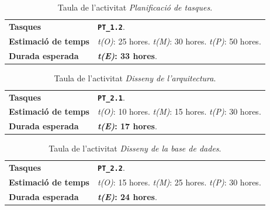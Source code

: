 \documentclass[a4paper,12pt]{ThesisStyle}
\begin{document}
\begin{table}[H]
  \begin{tabularx}{\textwidth}{l | X}
    \toprule
    \rowcolor{Gray}
    \multicolumn{2}{c}{\texttt{\textbf{A2:}} Planificació de tasques}\\
    \midrule[0.9pt]
    \textbf{Tasques}                 & \texttt{\textbf{PT\_1.2}}.\\
    \midrule
    \textbf{Estimació de temps}      & \textit{t(O)}: 25 hores.
    \newline \textit{t(M)}: 30 hores.
    \newline \textit{t(P)}: 50 hores.\\
    \midrule
    \textbf{Durada esperada}         & \textbf{\textit{t(E)}: 33 hores}.\\
    \bottomrule
  \end{tabularx}
  \caption{\label{taula:a2} Taula de l'activitat \emph{Planificació de tasques}.}
\end{table}

\begin{table}[H]
  \begin{tabularx}{\textwidth}{l | X}
    \toprule
    \rowcolor{Green}
    \multicolumn{2}{c}{\texttt{\textbf{A3:}} Disseny de l'arquitectura}\\
    \midrule[0.9pt]
    \textbf{Tasques}                 & \texttt{\textbf{PT\_2.1}}.\\
    \midrule
    \textbf{Estimació de temps}      & \textit{t(O)}: 10 hores.
    \newline \textit{t(M)}: 15 hores.
    \newline \textit{t(P)}: 30 hores.\\
    \midrule
    \textbf{Durada esperada}         & \textbf{\textit{t(E)}: 17 hores}.\\
    \bottomrule
  \end{tabularx}
  \caption{\label{taula:a3} Taula de l'activitat \emph{Disseny de l'arquitectura}.}
\end{table}

\begin{table}[H]
  \begin{tabularx}{\textwidth}{l | X}
    \toprule
    \rowcolor{Green}
    \multicolumn{2}{c}{\texttt{\textbf{A4:}} Disseny de la base de dades}\\
    \midrule[0.9pt]
    \textbf{Tasques}                 & \texttt{\textbf{PT\_2.2}}.\\
    \midrule
    \textbf{Estimació de temps}      & \textit{t(O)}: 15 hores.
    \newline \textit{t(M)}: 25 hores.
    \newline \textit{t(P)}: 30 hores.\\
    \midrule
    \textbf{Durada esperada}         & \textbf{\textit{t(E)}: 24 hores}.\\
    \bottomrule
  \end{tabularx}
  \caption{\label{taula:a4} Taula de l'activitat \emph{Disseny de la base de dades}.}
\end{table}
\end{document}
